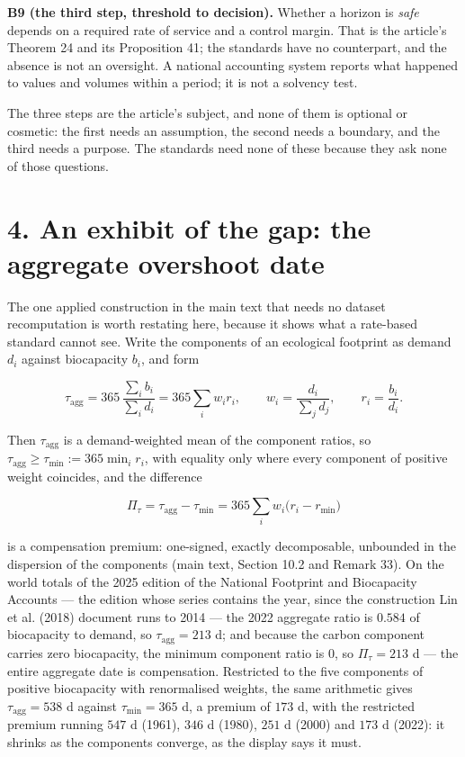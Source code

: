 \documentclass[11pt]{article}
\begin{document}
\textbf{B9 (the third step, threshold to decision).} Whether a horizon is \emph{safe} depends on a required rate of service and a control margin. That is the article's Theorem 24 and its Proposition 41; the standards have no counterpart, and the absence is not an oversight. A national accounting system reports what happened to values and volumes within a period; it is not a solvency test.

The three steps are the article's subject, and none of them is optional or cosmetic: the first needs an assumption, the second needs a boundary, and the third needs a purpose. The standards need none of these because they ask none of those questions.

\vspace{0.8em}

\section*{4. An exhibit of the gap: the aggregate overshoot date}\label{4-an-exhibit-of-the-gap-the-aggregate-overshoot-date}

The one applied construction in the main text that needs no dataset recomputation is worth restating here, because it shows what a rate-based standard cannot see. Write the components of an ecological footprint as demand \(d_i\) against biocapacity \(b_i\), and form

\[ \tau_{\mathrm{agg}}=365\,\frac{\sum_i b_i}{\sum_i d_i}=365\sum_i w_i r_i,\qquad w_i=\frac{d_i}{\sum_j d_j}, \qquad r_i=\frac{b_i}{d_i}. \]

Then \(\tau_{\mathrm{agg}}\) is a demand-weighted mean of the component ratios, so \(\tau_{\mathrm{agg}}\ge\tau_{\min}:=365\min_i r_i\), with equality only where every component of positive weight coincides, and the difference

\[ \Pi_\tau=\tau_{\mathrm{agg}}-\tau_{\min}=365\sum_i w_i\bigl(r_i-r_{\min}\bigr) \]

is a compensation premium: one-signed, exactly decomposable, unbounded in the dispersion of the components (main text, Section 10.2 and Remark 33). On the world totals of the 2025 edition of the National Footprint and Biocapacity Accounts --- the edition whose series contains the year, since the construction Lin et al. (2018) document runs to 2014 --- the 2022 aggregate ratio is \(0.584\) of biocapacity to demand, so \(\tau_{\mathrm{agg}} = 213\) d; and because the carbon component carries zero biocapacity, the minimum component ratio is \(0\), so \(\Pi_\tau = 213\) d --- the entire aggregate date is compensation. Restricted to the five components of positive biocapacity with renormalised weights, the same arithmetic gives \(\tau_{\mathrm{agg}} = 538\) d against \(\tau_{\min} = 365\) d, a premium of \(173\) d, with the restricted premium running \(547\) d (1961), \(346\) d (1980), \(251\) d (2000) and \(173\) d (2022): it shrinks as the components converge, as the display says it must.
\end{document}
